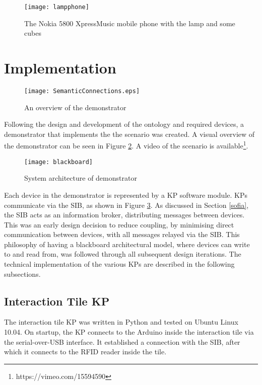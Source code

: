 \begin{figure}[bth]
\centering
\texttt{[image: lampphone]}
\caption{The Nokia 5800 XpressMusic mobile phone with the lamp and some cubes}
\label{lampphone}
\end{figure}



\section{Implementation}

\begin{figure}[bth]
\centering
\texttt{[image: SemanticConnections.eps]}
\caption{An overview of the demonstrator}
\label{semanticConnections}
\end{figure}

Following the design and development of the ontology and required devices, a demonstrator that implements the the scenario was created. A visual overview of the demonstrator can be seen in Figure \ref{semanticConnections}. A video of the scenario is available\footnote{https://vimeo.com/15594590}.

\begin{figure}[bth]
\centering
\texttt{[image: blackboard]}
\caption{System architecture of demonstrator}
\label{blackboard}
\end{figure}

Each device in the demonstrator is represented by a \ac{KP} software module. \acp{KP} communicate via the \ac{SIB}, as shown in Figure \ref{blackboard}. As discussed in Section \ref{sofia}, the \ac{SIB} acts as an information broker, distributing messages between devices. This was an early design decision to reduce coupling, by minimising direct communication between devices, with all messages relayed via the \ac{SIB}. This philosophy of having a blackboard architectural model, where devices can write to and read from, was followed through all subsequent design iterations. The technical implementation of the various \acp{KP} are described in the following subsections.


\subsection{Interaction Tile KP}

The interaction tile \ac{KP} was written in Python and tested on Ubuntu Linux 10.04. On startup, the \ac{KP} connects to the Arduino inside the interaction tile via the serial-over-USB interface. It established a connection with the \ac{SIB}, after which it connects to the \ac{RFID} reader inside the tile.

